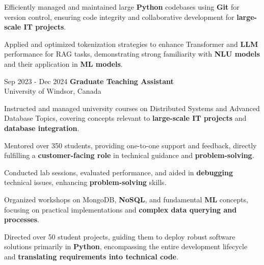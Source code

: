 \begin{onecolentry}
\begin{highlights}
                \item Efficiently managed and maintained large \textbf{Python} codebases using \textbf{Git} for version control, ensuring code integrity and collaborative development for \textbf{large-scale IT projects}.
                \item Applied and optimized tokenization strategies to enhance Transformer and \textbf{LLM} performance for RAG tasks, demonstrating strong familiarity with \textbf{NLU models} and their application in \textbf{ML models}.
            \end{highlights}
        \end{onecolentry}


        \vspace{0.2 cm}

        \begin{twocolentry}{
            Sep 2023 - Dec 2024
        }
            \textbf{Graduate Teaching Assistant} \\ University of Windsor, Canada\end{twocolentry}

        \vspace{0.10 cm}
        \begin{onecolentry}
            \begin{highlights}
                \item Instructed and managed university courses on Distributed Systems and Advanced Database Topics, covering concepts relevant to \textbf{large-scale IT projects} and \textbf{database integration}.
                \item Mentored over 350 students, providing one-to-one support and feedback, directly fulfilling a \textbf{customer-facing role} in technical guidance and \textbf{problem-solving}.
                \item Conducted lab sessions, evaluated performance, and aided in \textbf{debugging} technical issues, enhancing \textbf{problem-solving} skills.
                \item Organized workshops on MongoDB, \textbf{NoSQL}, and fundamental \textbf{ML} concepts, focusing on practical implementations and \textbf{complex data querying and processes}.
                \item Directed over 50 student projects, guiding them to deploy robust software solutions primarily in \textbf{Python}, encompassing the entire development lifecycle and \textbf{translating requirements into technical code}.
            \end{highlights}
        \end{onecolentry}

